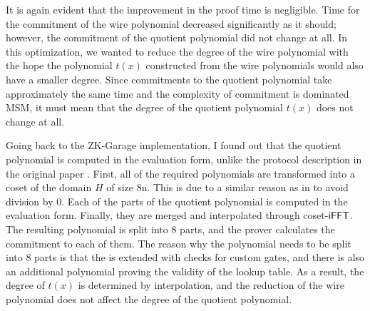 It is again evident that the improvement in the proof time is negligible. Time for the commitment of the wire polynomial decreased significantly as it should; however, the commitment of the quotient polynomial did not change at all. In this optimization, we wanted to reduce the degree of the wire polynomial with the hope the polynomial $t(x)$ constructed from the wire polynomials would also have a smaller degree. Since commitments to the quotient polynomial take approximately the same time and the complexity of commitment is dominated MSM, it must mean that the degree of the quotient polynomial $t(x)$ does not change at all. 

Going back to the ZK-Garage implementation, I found out that the quotient polynomial is computed in the evaluation form, unlike the protocol description in the original paper \cite{plonk}. First, all of the required polynomials are transformed into a coset of the domain $H$ of size 8n. This is due to a similar reason as in  to avoid division by 0. Each of the parts of the quotient polynomial is computed in the evaluation form. Finally, they are merged and interpolated through coset-$\mathsf{iFFT}$. The resulting polynomial is split into 8 parts, and the prover calculates the commitment to each of them. The reason why the polynomial needs to be split into 8 parts is that the  is extended with checks for custom gates, and there is also an additional polynomial proving the validity of the lookup table. As a result, the degree of $t(x)$ is determined by interpolation, and the reduction of the wire polynomial does not affect the degree of the quotient polynomial. 

\begin{pchstack}
\end{pchstack}

